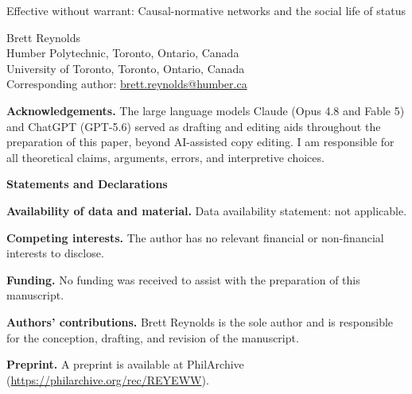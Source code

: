 \documentclass[12pt]{article}
\begin{document}
\thispagestyle{empty}

\begin{center}
{\LARGE Effective without warrant: Causal-normative networks and the social life of status}

\vspace{2em}
Brett Reynolds \\
Humber Polytechnic, Toronto, Ontario, Canada\\
University of Toronto, Toronto, Ontario, Canada\\
Corresponding author: \href{mailto:brett.reynolds@humber.ca}{brett.reynolds@humber.ca}
\end{center}

\vspace{3em}
\noindent\textbf{Acknowledgements.} The large language models Claude (Opus 4.8 and Fable 5) and ChatGPT (GPT-5.6) served as drafting and editing aids throughout the preparation of this paper, beyond AI-assisted copy editing. I am responsible for all theoretical claims, arguments, errors, and interpretive choices.

\vspace{1em}
\noindent\textbf{Statements and Declarations}

\vspace{0.5em}
\noindent\textbf{Availability of data and material.} Data availability statement: not applicable.

\vspace{0.5em}
\noindent\textbf{Competing interests.} The author has no relevant financial or non-financial interests to disclose.

\vspace{0.5em}
\noindent\textbf{Funding.} No funding was received to assist with the preparation of this manuscript.

\vspace{0.5em}
\noindent\textbf{Authors' contributions.} Brett Reynolds is the sole author and is responsible for the conception, drafting, and revision of the manuscript.

\vspace{0.5em}
\noindent\textbf{Preprint.} A preprint is available at PhilArchive (\url{https://philarchive.org/rec/REYEWW}).
\end{document}
